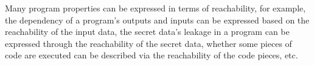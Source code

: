  
 Many program properties can be expressed in terms of reachability,
for example,
the dependency of a program's outputs and inputs can be expressed based on the reachability of the input data, 
the secret data's leakage in a program can be expressed through the reachability of the secret data, 
whether some pieces of code are executed can be described via the reachability of the code pieces, etc.
